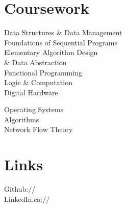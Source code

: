 \documentclass[]{deedy-resume-openfont}
\begin{document}
\begin{minipage}[t]{0.33\textwidth}
\section{Coursework}

Data Structures \& Data Management \\
Foundations of Sequential Programs \\
Elementary Algorithm Design  \\ \quad \& Data Abstraction \\
Functional Programming \\
Logic \& Computation \\
Digital Hardware \\
\sectionsep

Operating Systems \\
Algorithms \\
Network Flow Theory \\
\sectionsep


\section{Links}
Github:// \href{https://github.com/annalorimer}{} \\
LinkedIn.ca://  \href{https://ca.linkedin.com/in/annalorimer}{} \\
\sectionsep

%
%

\end{minipage}
\hfill
\end{document}

